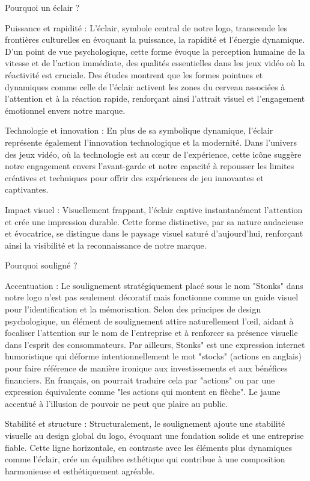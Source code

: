 Pourquoi un éclair ? 

Puissance et rapidité : L'éclair, symbole central de notre logo, transcende les frontières culturelles en évoquant la puissance, la rapidité et l'énergie dynamique. D'un point de vue psychologique, cette forme évoque la perception humaine de la vitesse et de l'action immédiate, des qualités essentielles dans les jeux vidéo où la réactivité est cruciale. Des études montrent que les formes pointues et dynamiques comme celle de l'éclair activent les zones du cerveau associées à l'attention et à la réaction rapide, renforçant ainsi l'attrait visuel et l'engagement émotionnel envers notre marque. 

Technologie et innovation : En plus de sa symbolique dynamique, l'éclair représente également l'innovation technologique et la modernité. Dans l'univers des jeux vidéo, où la technologie est au cœur de l'expérience, cette icône suggère notre engagement envers l'avant-garde et notre capacité à repousser les limites créatives et techniques pour offrir des expériences de jeu innovantes et captivantes. 

Impact visuel : Visuellement frappant, l'éclair captive instantanément l'attention et crée une impression durable. Cette forme distinctive, par sa nature audacieuse et évocatrice, se distingue dans le paysage visuel saturé d'aujourd'hui, renforçant ainsi la visibilité et la reconnaissance de notre marque. 

Pourquoi souligné ? 

Accentuation : Le soulignement stratégiquement placé sous le nom "Stonks" dans notre logo n'est pas seulement décoratif mais fonctionne comme un guide visuel pour l'identification et la mémorisation. Selon des principes de design psychologique, un élément de soulignement attire naturellement l'œil, aidant à focaliser l'attention sur le nom de l'entreprise et à renforcer sa présence visuelle dans l'esprit des consommateurs. Par ailleurs, Stonks" est une expression internet humoristique qui déforme intentionnellement le mot "stocks" (actions en anglais) pour faire référence de manière ironique aux investissements et aux bénéfices financiers. En français, on pourrait traduire cela par "actions" ou par une expression équivalente comme "les actions qui montent en flèche". Le jaune accentué à l’illusion de pouvoir ne peut que plaire au public. 

Stabilité et structure : Structuralement, le soulignement ajoute une stabilité visuelle au design global du logo, évoquant une fondation solide et une entreprise fiable. Cette ligne horizontale, en contraste avec les éléments plus dynamiques comme l'éclair, crée un équilibre esthétique qui contribue à une composition harmonieuse et esthétiquement agréable. 

